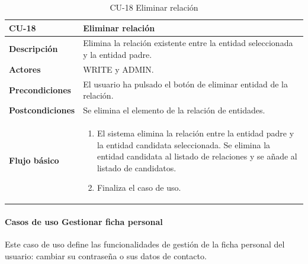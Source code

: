 \begin{table} [H]
    \centering
    \setlength{\leftmargini}{0.4cm}
	\resizebox{15cm}{!} { %
    \begin{tabular}{| m{3cm} | m{12cm} |}   
    \hline
	  \textbf{CU-18} & \textbf{Eliminar relación} \\\hline
	  \textbf{Descripción} & Elimina la relación existente entre la entidad seleccionada y la entidad padre. \\\hline
	  \textbf{Actores} &WRITE y ADMIN. \\\hline
	  \textbf{Precondiciones} & El usuario ha pulsado el botón de eliminar entidad de la relación. \\\hline
	  \textbf{Postcondiciones} & Se elimina el elemento de la relación de entidades. \\\hline
	  \textbf{Flujo básico} & 
		\begin{enumerate}
	  	\item El sistema elimina la relación entre la entidad padre y la entidad candidata seleccionada. Se elimina la entidad candidata al listado de relaciones y se añade al listado de candidatos.
		\item Finaliza el caso de uso.				
	  \end{enumerate} 	  	  
	  \\\hline
    \end{tabular}
    } %
    \caption{CU-18 Eliminar relación}
    \label{tab:cu-eliminar-relacion}
\end{table}


\paragraph{Casos de uso Gestionar ficha personal} 

Este caso de uso define las funcionalidades de gestión de la ficha personal del usuario: cambiar su contraseña o sus datos de contacto.

